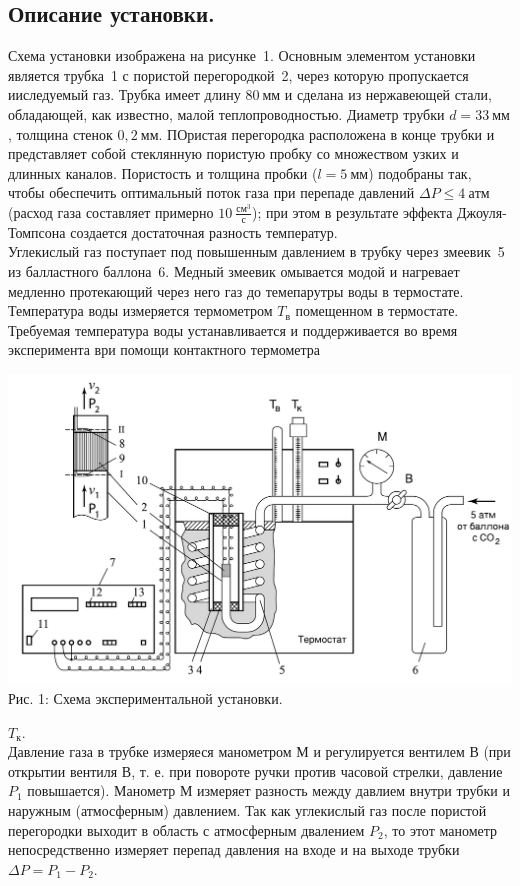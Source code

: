 \documentclass[a4paper,11pt]{article}
\begin{document}
\subsection{Описание установки.}
Схема установки изображена на рисунке~1. Основным элементом установки является трубка~1 с пористой перегородкой~2, через которую пропускается ииследуемый газ. Трубка имеет длину $80 \ мм$ и сделана из нержавеющей стали, обладающей, как известно, малой теплопроводностью. Диаметр трубки $d = 33\ мм$, толщина стенок $0,2\ мм$. ПОристая перегородка расположена в конце трубки и представляет собой стеклянную пористую пробку со множеством узких и длинных каналов. Пористость и толщина пробки ($l = 5\ мм$) подобраны так, чтобы обеспечить оптимальный поток газа при перепаде давлений $\Delta P \leq 4\ атм$ (расход газа составляет примерно $10\ \frac{см^{3}}{с}$); при этом в результате эффекта Джоуля-Томпсона создается достаточная разность температур.\\
Углекислый газ поступает под повышенным давлением в трубку через змеевик~5 из балластного баллона~6. Медный змеевик омывается модой и нагревает медленно протекающий через него газ до темепарутры воды в термостате. Температура воды измеряется термометром $T_{в}$ помещенном в термостате. Требуемая температура воды устанавливается и поддерживается во время эксперимента ври помощи контактного термометра
\begin{center}
  \includegraphics[scale = 0.35]{scheme1.png}\\
  Рис. 1: Схема экспериментальной установки.
\end{center}
$T_{к}$.\\
Давление газа в трубке измеряеся манометром $М$ и регулируется вентилем $В$ (при открытии вентиля $В$, т. е. при повороте ручки против часовой стрелки, давление $P_{1}$ повышается). Манометр $М$ измеряет разность между давлием внутри трубки и наружным (атмосферным) давлением. Так как углекислый газ после пористой перегородки выходит в область с атмосферным двалением $P_{2}$, то этот манометр непосредственно измеряет перепад давления на входе и на выходе трубки $\Delta P = P_{1} - P_{2}$.\\
\end{document}
